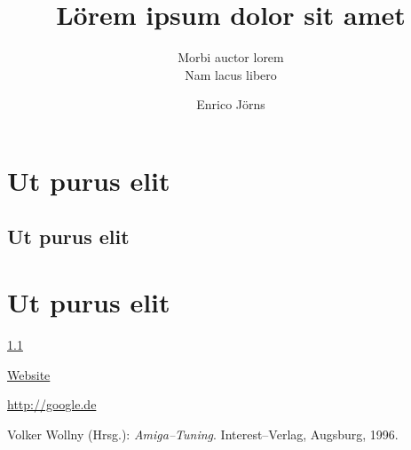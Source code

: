 \documentclass[a4paper,extramargin,violet,hyperrefdark]{tubsartcl}
\title{Lörem ipsum dolor sit amet}
\subtitle{Morbi auctor lorem\vphantom{g}\\ %
Nam lacus libero}
\author{Enrico Jörns}
\begin{document}
\tableofcontents

\section{Ut purus elit}
\subsection{Ut purus elit}\label{asdf}
\section{Ut purus elit}
\lipsum[1]

\Large

\ref{asdf}

\href{bla}{Website}

\url{http://google.de}

\cite{atuning}


\begin{thebibliography}{sotief}
  Volker Wollny (Hrsg.): {\it Amiga--Tuning}.
                   Interest--Verlag, Augsburg, 1996.
\end{thebibliography}
\end{document}

